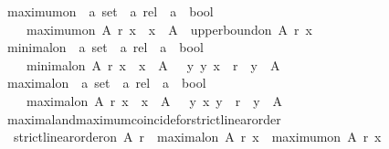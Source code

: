 \begin{isabellebody}
\isanewline
{}\isamarkupfalse%
\ maximum{\isacharunderscore}on\ {\isacharcolon}{\isacharcolon}\ {\isachardoublequoteopen}{\isacharprime}a\ set\ {\isasymRightarrow}\ {\isacharprime}a\ rel\ {\isasymRightarrow}\ {\isacharprime}a\ {\isasymRightarrow}\ bool{\isachardoublequoteclose}\isanewline
\ \ \ \isanewline
\ \ \ \ {\isachardoublequoteopen}maximum{\isacharunderscore}on\ A\ r\ x\ {\isacharequal}\ {\isacharparenleft}x\ {\isasymin}\ A\ {\isasymand}\ upper{\isacharunderscore}bound{\isacharunderscore}on\ A\ r\ x{\isacharparenright}{\isachardoublequoteclose}\ \isanewline
\isanewline
{}\isamarkupfalse%
\ minimal{\isacharunderscore}on\ {\isacharcolon}{\isacharcolon}\ {\isachardoublequoteopen}{\isacharprime}a\ set\ {\isasymRightarrow}\ {\isacharprime}a\ rel\ {\isasymRightarrow}\ {\isacharprime}a\ {\isasymRightarrow}\ bool{\isachardoublequoteclose}\isanewline
\ \ \ \isanewline
\ \ \ \ {\isachardoublequoteopen}minimal{\isacharunderscore}on\ A\ r\ x\ {\isacharequal}\ {\isacharparenleft}x\ {\isasymin}\ A\ {\isasymand}\ {\isacharparenleft}{\isasymforall}\ y{\isachardot}\ {\isacharparenleft}y{\isacharcomma}\ x{\isacharparenright}\ {\isasymin}\ r\ {\isasymlongrightarrow}\ y\ {\isasymnotin}\ A{\isacharparenright}{\isacharparenright}{\isachardoublequoteclose}\ \isanewline
\isanewline
{}\isamarkupfalse%
\ maximal{\isacharunderscore}on\ {\isacharcolon}{\isacharcolon}\ {\isachardoublequoteopen}{\isacharprime}a\ set\ {\isasymRightarrow}\ {\isacharprime}a\ rel\ {\isasymRightarrow}\ {\isacharprime}a\ {\isasymRightarrow}\ bool{\isachardoublequoteclose}\isanewline
\ \ \ \isanewline
\ \ \ \ {\isachardoublequoteopen}maximal{\isacharunderscore}on\ A\ r\ x\ {\isacharequal}\ {\isacharparenleft}x\ {\isasymin}\ A\ {\isasymand}\ {\isacharparenleft}{\isasymforall}\ y{\isachardot}\ {\isacharparenleft}x{\isacharcomma}\ y{\isacharparenright}\ {\isasymin}\ r\ {\isasymlongrightarrow}\ y\ {\isasymnotin}\ A{\isacharparenright}{\isacharparenright}{\isachardoublequoteclose}\isanewline
\isanewline
{}\isamarkupfalse%
\ maximal{\isacharunderscore}and{\isacharunderscore}maximum{\isacharunderscore}coincide{\isacharunderscore}for{\isacharunderscore}strict{\isacharunderscore}linear{\isacharunderscore}order\ {\isacharcolon}\isanewline
\ \ {\isachardoublequoteopen}strict{\isacharunderscore}linear{\isacharunderscore}order{\isacharunderscore}on\ A\ r\ {\isasymLongrightarrow}\ maximal{\isacharunderscore}on\ A\ r\ x\ {\isacharequal}\ maximum{\isacharunderscore}on\ A\ r\ x{\isachardoublequoteclose}\isanewline

\end{isabellebody}
